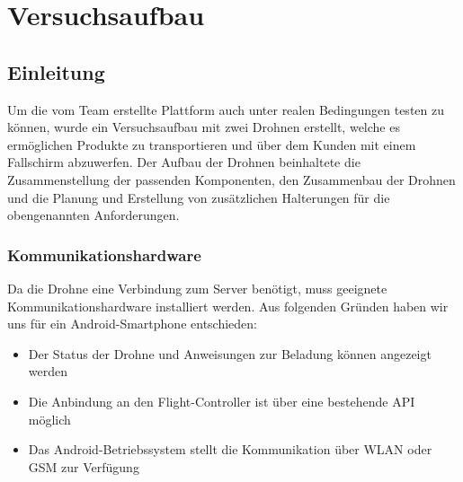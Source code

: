 \chapter{Versuchsaufbau}

\section{Einleitung}

Um die vom Team erstellte Plattform auch unter realen Bedingungen testen zu können, wurde ein Versuchsaufbau mit zwei Drohnen erstellt, welche es ermöglichen Produkte zu transportieren und über dem Kunden mit einem Fallschirm abzuwerfen. Der Aufbau der Drohnen beinhaltete die Zusammenstellung der passenden Komponenten, den Zusammenbau der Drohnen und die Planung und Erstellung von zusätzlichen Halterungen für die obengenannten Anforderungen.\\

\subsection{Kommunikationshardware}
\label{sec:communication-hardware}
Da die Drohne eine Verbindung zum Server benötigt, muss geeignete Kommunikationshardware installiert werden. Aus folgenden Gründen haben wir uns für ein Android-Smartphone entschieden:
\begin{itemize}
	\item{Der Status der Drohne und Anweisungen zur Beladung können angezeigt werden}
	\item{Die Anbindung an den \Gls{Flight-Controller} ist über eine bestehende API möglich}
	\item{Das Android-Betriebssystem stellt die Kommunikation über WLAN oder GSM zur Verfügung}
\end{itemize}

